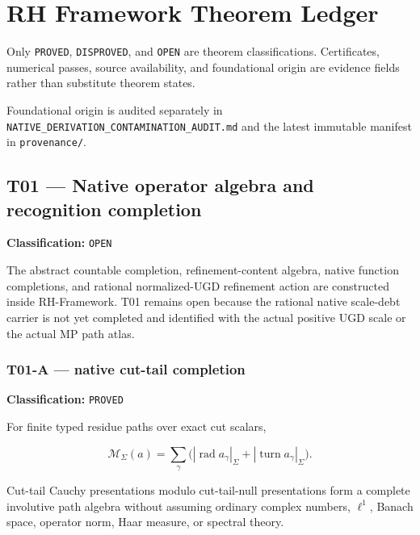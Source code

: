 \hypertarget{rh-framework-theorem-ledger}{%
\chapter{RH Framework Theorem Ledger}\label{rh-framework-theorem-ledger}}

Only \texttt{PROVED}, \texttt{DISPROVED}, and \texttt{OPEN} are theorem classifications.
Certificates, numerical passes, source availability, and foundational origin are
evidence fields rather than substitute theorem states.

Foundational origin is audited separately in
\texttt{NATIVE\_DERIVATION\_CONTAMINATION\_AUDIT.md} and the latest immutable manifest in
\texttt{provenance/}.

\hypertarget{t01-native-operator-algebra-and-recognition-completion}{%
\section{T01 --- Native operator algebra and recognition completion}\label{t01-native-operator-algebra-and-recognition-completion}}

\textbf{Classification:} \texttt{OPEN}

The abstract countable completion, refinement-content algebra, native function
completions, and rational normalized-UGD refinement action are constructed
inside RH-Framework. T01 remains open because the rational native scale-debt
carrier is not yet completed and identified with the actual positive UGD scale
or the actual MP path atlas.

\hypertarget{t01-a-native-cut-tail-completion}{%
\subsection{T01-A --- native cut-tail completion}\label{t01-a-native-cut-tail-completion}}

\textbf{Classification:} \texttt{PROVED}

For finite typed residue paths over exact cut scalars,

\[
\mathcal M_\Sigma(a)
=
\sum_\gamma
\bigl(|\operatorname{rad}a_\gamma|_\Sigma
+|\operatorname{turn}a_\gamma|_\Sigma\bigr).
\]

Cut-tail Cauchy presentations modulo cut-tail-null presentations form a complete
involutive path algebra without assuming ordinary complex numbers, \(\ell^1\),
Banach space, operator norm, Haar measure, or spectral theory.

